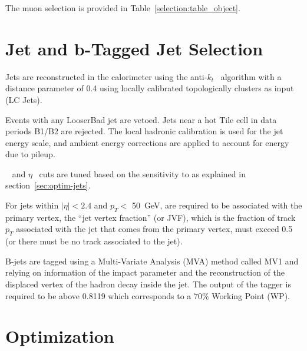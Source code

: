 The muon selection is provided in Table~\ref{selection:table_object}. 

\section{Jet and b-Tagged Jet Selection}

Jets are reconstructed in the calorimeter using the anti-$k_t$~\cite{Cacciari:2008gp} algorithm
with a distance parameter of 0.4 using locally calibrated
topologically clusters as input (LC Jets). 

Events with any LooserBad jet are vetoed. Jets near a hot Tile cell in data periods
B1/B2 are rejected. The local hadronic calibration is used for
the jet energy scale, and ambient energy corrections are applied to account
for energy due to pileup.

\pt~ and $\eta$~ cuts are tuned based on the sensitivity to \tth
as explained in section~\ref{sec:optim-jets}. 

For jets within $|\eta| < 2.4$ and $p_T <$ 50~GeV, are required to be
associated with the primary vertex, the ``jet vertex fraction'' (or JVF),
which is the fraction of track $p_T$ associated with the jet that comes from the primary vertex,
must exceed 0.5 (or there must be no track associated to the jet). 

B-jets are tagged using a Multi-Variate Analysis (MVA) method called MV1 and relying on information
of the impact parameter and the reconstruction of the displaced vertex of the
hadron decay inside the jet.%
 The output of the tagger is required to be above 0.8119 which corresponds to a $70\%$ Working Point (WP).



\section{Optimization}

\label{section:optimization}

